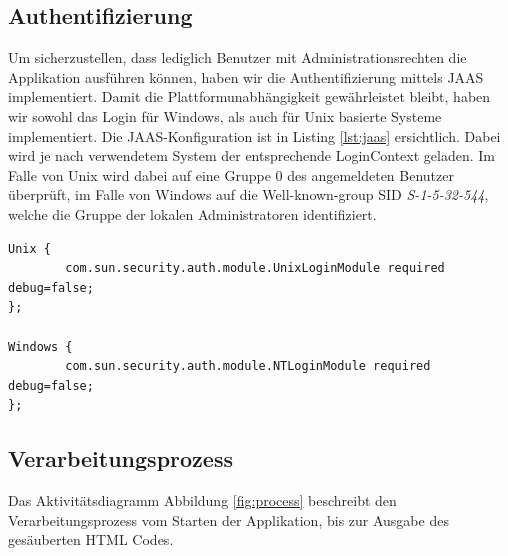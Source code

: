 \subsection{Authentifizierung}

Um sicherzustellen, dass lediglich Benutzer mit Administrationsrechten die Applikation ausführen können,
haben wir die Authentifizierung mittels JAAS implementiert. Damit die Plattformunabhängigkeit 
gewährleistet bleibt, haben wir sowohl das Login für Windows, als auch für Unix basierte Systeme 
implementiert. Die JAAS-Konfiguration ist in Listing \ref{lst:jaas} ersichtlich. Dabei wird je
nach verwendetem System der entsprechende LoginContext geladen. Im Falle von Unix wird dabei auf eine
Gruppe 0 des angemeldeten Benutzer überprüft, im Falle von Windows auf die Well-known-group 
SID\cite{MS:SID} \textit{S-1-5-32-544}, welche die Gruppe der lokalen Administratoren identifiziert. 
\newline
\begin{lstlisting}[caption="JAAS konfiguration im File jaas\_security.conf", label={lst:jaas}]
Unix {
        com.sun.security.auth.module.UnixLoginModule required debug=false;
};

Windows {
        com.sun.security.auth.module.NTLoginModule required debug=false;
};
\end{lstlisting}

\newpage

\subsection{Verarbeitungsprozess}

Das Aktivitätsdiagramm Abbildung \ref{fig:process} beschreibt den Verarbeitungsprozess vom Starten der Applikation, bis zur Ausgabe des gesäuberten HTML Codes.

